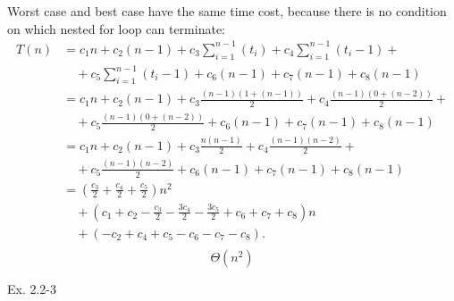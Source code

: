 \documentclass[a4paper,11pt]{exam}
\begin{document}
Worst case and best case have the same time cost, because there is no condition on which nested for loop can terminate:
\[
    \begin{split}
        T(n) & = c_1 n + c_2 (n - 1) + c_3 \sum_{i = 1}^{n - 1} (t_i) + c_4 \sum_{i = 1}^{n - 1} (t_i - 1) + \\
            & \quad + c_5 \sum_{i = 1}^{n - 1} (t_i - 1) + c_6 (n - 1) + c_7 (n - 1) + c_8 (n - 1) \\
        & = c_1 n + c_2 (n - 1) + c_3 \frac{(n - 1)(1 + (n - 1))}{2} + c_4 \frac{(n - 1)(0 + (n - 2))}{2} + \\
            & \quad + c_5 \frac{(n - 1)(0 + (n - 2))}{2} + c_6 (n - 1) + c_7 (n - 1) + c_8 (n - 1) \\
        & = c_1 n + c_2 (n - 1) + c_3 \frac{n(n - 1)}{2} + c_4 \frac{(n - 1)(n - 2)}{2} + \\
            & \quad + c_5 \frac{(n - 1)(n - 2)}{2} + c_6 (n - 1) + c_7 (n - 1) + c_8 (n - 1) \\
        & = \left(\frac{c_3}{2} + \frac{c_4}{2} + \frac{c_5}{2} \right) n^2 \\ 
        & \quad + \left( c_1 + c_2 - \frac{c_3}{2} - \frac{3 c_4}{2} - \frac{3 c_5}{2} + c_6 + c_7 + c_8 \right) n \\
        & \quad + \left( -c_2 + c_4 + c_5 - c_6 - c_7 - c_8 \right). \\
    \end{split}
\]
\[
    \Theta \left( n^2 \right)
\]

Ex. 2.2-3
\end{document}
